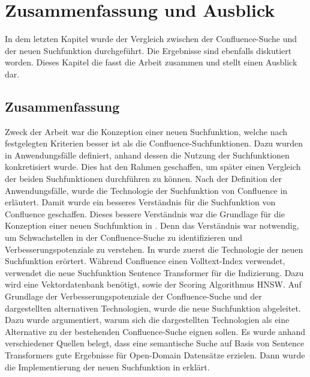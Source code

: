 \chapter{Zusammenfassung und Ausblick}
In dem letzten Kapitel wurde der Vergleich zwischen der Confluence-Suche und der neuen Suchfunktion durchgeführt.
Die Ergebnisse sind ebenfalls diskutiert worden.
Dieses Kapitel die fasst die Arbeit zusammen und stellt einen Ausblick dar.

\section{Zusammenfassung}
Zweck der Arbeit war die Konzeption einer neuen Suchfunktion, welche nach festgelegten Kriterien besser ist als die Confluence-Suchfunktionen.
Dazu wurden in  Anwendungsfälle definiert, anhand dessen die Nutzung der Suchfunktionen konkretisiert wurde.
Dies hat den Rahmen geschaffen, um später einen Vergleich der beiden Suchfunktionen durchführen zu können.
Nach der Definition der Anwendungsfälle, wurde die Technologie der Suchfunktion von Confluence in  erläutert.
Damit wurde ein besseres Verständnis für die Suchfunktion von Confluence geschaffen.
Dieses bessere Verständnis war die Grundlage für die Konzeption einer neuen Suchfunktion in .
Denn das Verständnis war notwendig, um Schwachstellen in der Confluence-Suche zu identifizieren und Verbesserungspotenziale zu verstehen.
In  wurde zuerst die Technologie der neuen Suchfunktion erörtert.
Während Confluence einen Volltext-Index verwendet, verwendet die neue Suchfunktion Sentence Transformer für die Indizierung.
Dazu wird eine Vektordatenbank benötigt, sowie der Scoring Algorithmus HNSW.
Auf Grundlage der Verbesserungspotenziale der Confluence-Suche und der dargestellten alternativen Technologien, wurde die neue Suchfunktion abgeleitet.
Dazu wurde argumentiert, warum sich die dargestellten Technologien als eine Alternative zu der bestehenden Confluence-Suche eignen sollen.
Es wurde anhand verschiedener Quellen belegt, dass eine semantische Suche auf Basis von Sentence Transformers gute Ergebnisse für Open-Domain Datensätze erzielen. 
Dann wurde die Implementierung der neuen Suchfunktion in  erklärt.\\

